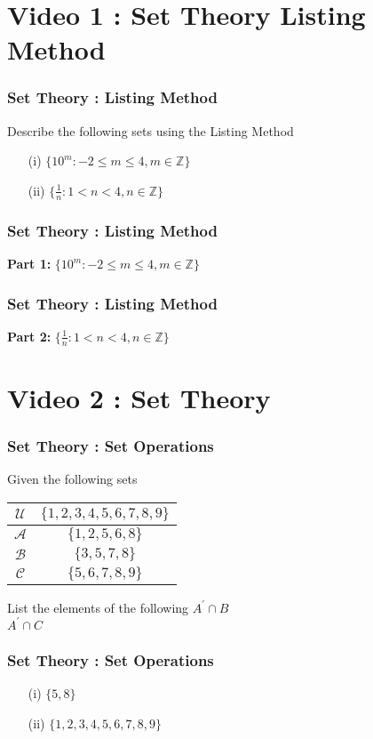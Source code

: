 \documentclass{beamer}
\begin{document}
\section{Video 1 :  Set Theory Listing Method}
\begin{frame}
\frametitle{Set Theory : Listing Method}
\Large
Describe the following sets using the Listing Method

\begin{itemize}
\item[(i)] $ \{ 10^m : -2 \leq m \leq 4, m \in \mathbb{Z} \} $
\item[(ii)]  $ \{ \frac{1}{n}: 1 < n < 4, n \in \mathbb{Z} \} $
\end{itemize}
\end{frame}

\begin{frame}
\frametitle{Set Theory : Listing Method}
\Large
\vspace{-4cm}
\textbf{Part 1:} $ \{ 10^m : -2 \leq m \leq 4, m \in \mathbb{Z} \} $

\end{frame}
\begin{frame}
\frametitle{Set Theory : Listing Method}
\Large
\vspace{-4cm}
\textbf{Part 2:} $ \{ \frac{1}{n}: 1 < n < 4, n \in \mathbb{Z} \} $

\end{frame}
\section{Video 2 : Set Theory}
\begin{frame}
\frametitle{Set Theory : Set Operations}
\Large
Given the following sets

\begin{center}
\begin{tabular}{|c|c|} \hline
$\mathcal{U}$ & $\{1,2,3,4,5,6,7,8,9\}$ \\ \hline
$\mathcal{A}$ & $\{1,2,5,6,8\}$ \\ \hline
$\mathcal{B}$ & $\{3,5,7,8\}$ \\ \hline
$\mathcal{C}$ & $\{5,6,7,8,9\}$ \\ \hline
\end{tabular}
\end{center}

List the elements of the following
$A^{\prime} \cap B $\\
$A^{\prime} \cap C $\\
\end{frame}
\begin{frame}
\frametitle{Set Theory : Set Operations}
\Large
\begin{itemize}
\item[(i)] $\{5,8\}$
\item[(ii)] $\{1,2,3,4,5,6,7,8,9\}$ 
\end{itemize}
\end{frame}
\end{document}
